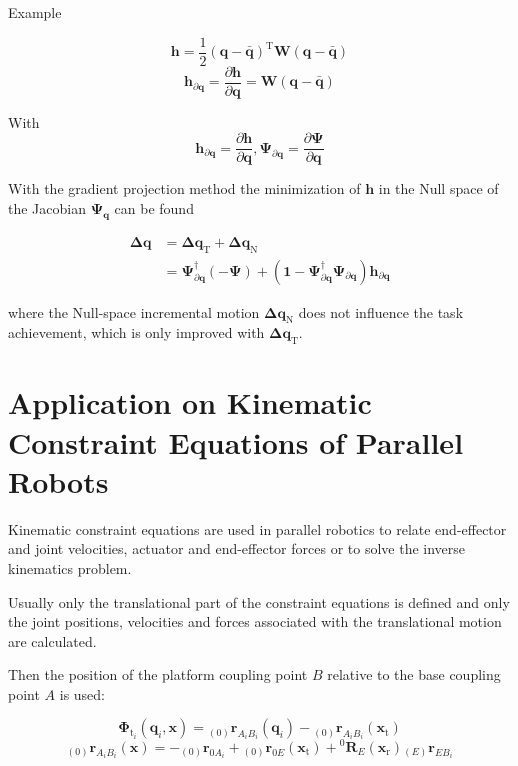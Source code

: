 \documentclass[twocolumn,10pt]{IFTOMM}
\newcommand{\bm}[1]{\boldsymbol{#1}}
\newcommand{\ortvek}[4]{{ }_{(#1)}{\boldsymbol{#2}}^{#3}_{#4} }
\newcommand{\rotmat}[2]{{{ }^{#1}\boldsymbol{R}}_{#2}}
\newcommand{\transp}[0]{{\mathrm{T}}}
\begin{document}
Example

\begin{equation}
\bm{h}
=
\frac{1}{2} (\bm{q}-\bar{\bm{q}})^\transp\bm{W}(\bm{q}-\bar{\bm{q}})
\end{equation}  
%
\begin{equation}
\bm{h}_{\partial\bm{q}}
=
\frac{\partial \bm{h}}{\partial \bm{q}}
=
\bm{W}(\bm{q}-\bar{\bm{q}})
\end{equation}

With
\begin{equation}
\bm{h}_{\partial\bm{q}}=\frac{\partial \bm{h}}{\partial \bm{q}},
\bm{\Psi}_{\partial\bm{q}}=\frac{\partial \bm{\Psi}}{\partial \bm{q}}
\end{equation}


With the gradient projection method the minimization of $\bm{h}$ in the Null space of the Jacobian $\bm{\Psi}_{\bm{q}}$ can be found

\begin{align}
\bm{\Delta}\bm{q}
&=
\bm{\Delta}\bm{q}_{\mathrm{T}} + \bm{\Delta}\bm{q}_{\mathrm{N}} \\
&=
\bm{\Psi}_{\partial\bm{q}}^{\dagger} (-\bm{\Psi}) + (\bm{1}-\bm{\Psi}_{\partial\bm{q}}^{\dagger}\bm{\Psi}_{\partial\bm{q}}) \bm{h}_{\partial\bm{q}}
\end{align}

where the Null-space incremental motion $\bm{\Delta}\bm{q}_{\mathrm{N}}$ does not influence the task achievement, which is only improved with $\bm{\Delta}\bm{q}_{\mathrm{T}}$.

\section{Application on Kinematic Constraint Equations of Parallel Robots}
\label{sec:ParRobKinConstr}

Kinematic constraint equations are used in parallel robotics to relate end-effector and joint velocities, actuator and end-effector forces or to solve the inverse kinematics problem.

Usually only the translational part of the constraint equations is defined and only the joint positions, velocities and forces associated with the translational motion are calculated. %

Then the position of the platform coupling point $B$ relative to the base coupling point $A$ is used:

\begin{equation}
\bm{\Phi}_{\mathrm{t}_i}(\bm{q}_i,\bm{x}) = \ortvek{0}{r}{}{A_iB_i}(\bm{q}_i) - \ortvek{0}{r}{}{A_iB_i}(\bm{x}_{\mathrm{t}})
\end{equation}
\begin{equation}
\ortvek{0}{r}{}{A_iB_i}(\bm{x}) = 
- \ortvek{0}{r}{}{0A_i}
+ \ortvek{0}{r}{}{0E}(\bm{x}_{\mathrm{t}}) + \rotmat{0}{E}(\bm{x}_{\mathrm{r}}) \ortvek{E}{r}{}{EB_i}
\end{equation}
\end{document}
